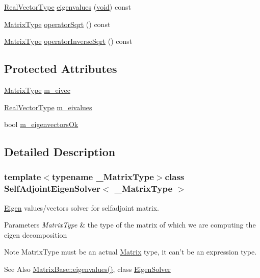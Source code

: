 \begin{DoxyCompactItemize}
\item 
\hyperlink{class_self_adjoint_eigen_solver_ac519b1b30c0460a1485c38dcd6891d6e}{Real\-Vector\-Type} \hyperlink{class_self_adjoint_eigen_solver_a355c1b37a61b0f8740f410b271f2ac46}{eigenvalues} (\hyperlink{group___u_a_v_objects_plugin_ga444cf2ff3f0ecbe028adce838d373f5c}{void}) const 
\item 
\hyperlink{class_self_adjoint_eigen_solver_aa4841a3365da9edfb78e6aff605d7da8}{Matrix\-Type} \hyperlink{class_self_adjoint_eigen_solver_a2b4432ba1f6098ca1906d0e1899e3a47}{operator\-Sqrt} () const 
\item 
\hyperlink{class_self_adjoint_eigen_solver_aa4841a3365da9edfb78e6aff605d7da8}{Matrix\-Type} \hyperlink{class_self_adjoint_eigen_solver_a439d3a5f270475036c105cb3c5707f47}{operator\-Inverse\-Sqrt} () const 
\end{DoxyCompactItemize}
\subsection*{Protected Attributes}
\begin{DoxyCompactItemize}
\item 
\hyperlink{class_self_adjoint_eigen_solver_aa4841a3365da9edfb78e6aff605d7da8}{Matrix\-Type} \hyperlink{class_self_adjoint_eigen_solver_a920afdd9c7f98526217645ed6589c6a1}{m\-\_\-eivec}
\item 
\hyperlink{class_self_adjoint_eigen_solver_ac519b1b30c0460a1485c38dcd6891d6e}{Real\-Vector\-Type} \hyperlink{class_self_adjoint_eigen_solver_acff6540258711b3dfd52cd833e78ebb5}{m\-\_\-eivalues}
\item 
bool \hyperlink{class_self_adjoint_eigen_solver_a9daf6a89a1717a7d4804bcff80845bf3}{m\-\_\-eigenvectors\-Ok}
\end{DoxyCompactItemize}


\subsection{Detailed Description}
\subsubsection*{template$<$typename \-\_\-\-Matrix\-Type$>$class Self\-Adjoint\-Eigen\-Solver$<$ \-\_\-\-Matrix\-Type $>$}

\hyperlink{namespace_eigen}{Eigen} values/vectors solver for selfadjoint matrix. 


\begin{DoxyParams}{Parameters}
{\em Matrix\-Type} & the type of the matrix of which we are computing the eigen decomposition\\
\hline
\end{DoxyParams}
\begin{DoxyNote}{Note}
Matrix\-Type must be an actual \hyperlink{class_matrix}{Matrix} type, it can't be an expression type.
\end{DoxyNote}
\begin{DoxySeeAlso}{See Also}
\hyperlink{class_matrix_base_a335e48e1808d344d8f23ab4cfc5a62b7}{Matrix\-Base\-::eigenvalues()}, class \hyperlink{class_eigen_solver}{Eigen\-Solver} 
\end{DoxySeeAlso}


